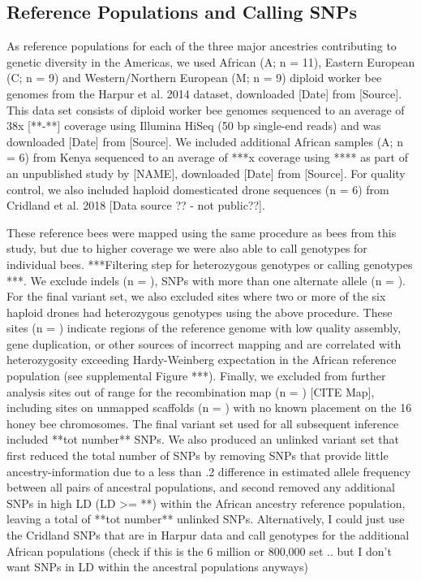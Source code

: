\documentclass[12pt]{report}
\begin{document}
\subsection{Reference Populations and Calling SNPs}
As reference populations for each of the three major ancestries contributing to genetic diversity in the Americas, we used African (A; n = 11), Eastern European (C; n = 9) and Western/Northern European (M; n = 9) diploid worker bee genomes from the Harpur et al. 2014 dataset, downloaded [Date] from [Source]. This data set consists of diploid worker bee genomes sequenced to an average of 38x [**-**] coverage using Illumina HiSeq (50 bp single-end reads) and was downloaded [Date] from [Source]. We included additional African samples (A; n = 6) from Kenya sequenced to an average of ***x coverage using **** as part of an unpublished study by [NAME], downloaded [Date] from [Source]. For quality control, we also included haploid domesticated drone sequences (n = 6) from Cridland et al. 2018 [Data source ?? - not public??]. \par
These reference bees were mapped using the same procedure as bees from this study, but due to higher coverage we were also able to call genotypes for individual bees. ***Filtering step for heterozygous genotypes or calling genotypes ***. We exclude indels (n = ), SNPs with more than one alternate allele (n = ). For the final variant set, we also excluded sites where two or more of the six haploid drones had heterozygous genotypes using the above procedure. These sites (n = ) indicate regions of the reference genome with low quality assembly, gene duplication, or other sources of incorrect mapping and are correlated with heterozygosity exceeding Hardy-Weinberg expectation in the African reference population (see supplemental Figure ***). Finally, we excluded from further analysis sites out of range for the recombination map (n = ) [CITE Map], including sites on unmapped scaffolds (n = ) with no known placement on the 16 honey bee chromosomes. The final variant set used for all subsequent inference included **tot number** SNPs. We also produced an unlinked variant set that first reduced the total number of SNPs by removing SNPs that provide little ancestry-information due to a less than .2 difference in estimated allele frequency between all pairs of ancestral populations, and second removed any additional SNPs in high LD (LD >= **) within the African ancestry reference population, leaving a total of **tot number** unlinked SNPs.
Alternatively, I could just use the Cridland SNPs that are in Harpur data and call genotypes for the additional African populations (check if this is the 6 million or 800,000 set .. but I don't want SNPs in LD within the ancestral populations anyways)
\end{document}
